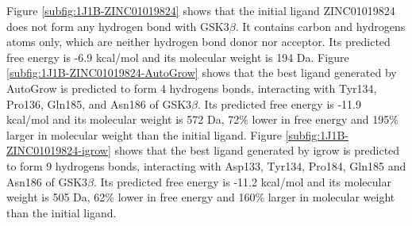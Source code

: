 \documentclass[10pt,conference,letterpaper]{IEEEtran}
\begin{document}

Figure \ref{subfig:1J1B-ZINC01019824} shows that the initial ligand ZINC01019824 does not form any hydrogen bond with GSK3$\beta$. It contains carbon and hydrogens atoms only, which are neither hydrogen bond donor nor acceptor. Its predicted free energy is -6.9 kcal/mol and its molecular weight is 194 Da.
Figure \ref{subfig:1J1B-ZINC01019824-AutoGrow} shows that the best ligand generated by AutoGrow is predicted to form 4 hydrogens bonds, interacting with Tyr134, Pro136, Gln185, and Asn186 of GSK3$\beta$. Its predicted free energy is -11.9 kcal/mol and its molecular weight is 572 Da, 72\% lower in free energy and 195\% larger in molecular weight than the initial ligand.
Figure \ref{subfig:1J1B-ZINC01019824-igrow} shows that the best ligand generated by igrow is predicted to form 9 hydrogens bonds, interacting with Asp133, Tyr134, Pro184, Gln185 and Asn186 of GSK3$\beta$. Its predicted free energy is -11.2 kcal/mol and its molecular weight is 505 Da, 62\% lower in free energy and 160\% larger in molecular weight than the initial ligand.

\end{document}
